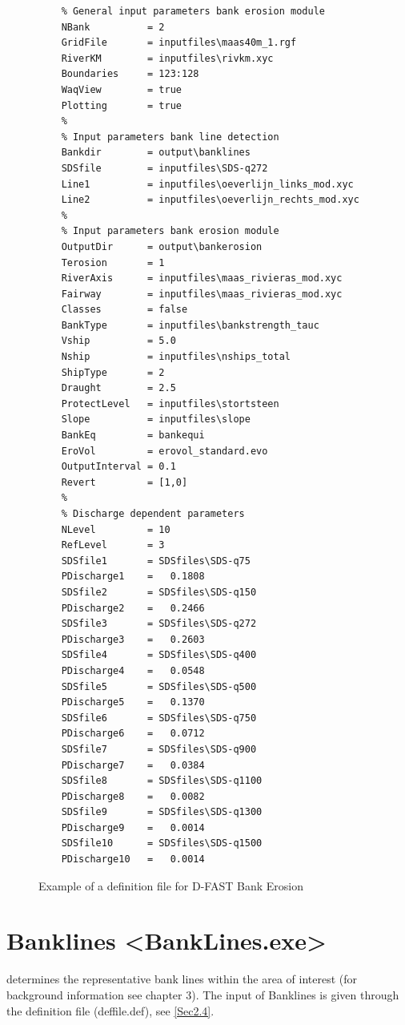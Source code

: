 \begin{figure}
\begin{verbatim}
    % General input parameters bank erosion module
    NBank          = 2
    GridFile       = inputfiles\maas40m_1.rgf
    RiverKM        = inputfiles\rivkm.xyc
    Boundaries     = 123:128
    WaqView        = true
    Plotting       = true
    %
    % Input parameters bank line detection
    Bankdir        = output\banklines
    SDSfile        = inputfiles\SDS-q272
    Line1          = inputfiles\oeverlijn_links_mod.xyc
    Line2          = inputfiles\oeverlijn_rechts_mod.xyc
    %
    % Input parameters bank erosion module
    OutputDir      = output\bankerosion
    Terosion       = 1
    RiverAxis      = inputfiles\maas_rivieras_mod.xyc
    Fairway        = inputfiles\maas_rivieras_mod.xyc
    Classes        = false
    BankType       = inputfiles\bankstrength_tauc
    Vship          = 5.0
    Nship          = inputfiles\nships_total
    ShipType       = 2
    Draught        = 2.5
    ProtectLevel   = inputfiles\stortsteen
    Slope          = inputfiles\slope
    BankEq         = bankequi
    EroVol         = erovol_standard.evo
    OutputInterval = 0.1
    Revert         = [1,0]
    %
    % Discharge dependent parameters
    NLevel         = 10
    RefLevel       = 3
    SDSfile1       = SDSfiles\SDS-q75
    PDischarge1    =   0.1808
    SDSfile2       = SDSfiles\SDS-q150
    PDischarge2    =   0.2466
    SDSfile3       = SDSfiles\SDS-q272
    PDischarge3    =   0.2603
    SDSfile4       = SDSfiles\SDS-q400
    PDischarge4    =   0.0548
    SDSfile5       = SDSfiles\SDS-q500
    PDischarge5    =   0.1370
    SDSfile6       = SDSfiles\SDS-q750
    PDischarge6    =   0.0712
    SDSfile7       = SDSfiles\SDS-q900
    PDischarge7    =   0.0384
    SDSfile8       = SDSfiles\SDS-q1100
    PDischarge8    =   0.0082
    SDSfile9       = SDSfiles\SDS-q1300
    PDischarge9    =   0.0014
    SDSfile10      = SDSfiles\SDS-q1500
    PDischarge10   =   0.0014
\end{verbatim}
\caption{Example of a definition file for D-FAST Bank Erosion}
\label{Fig2.1}
\end{figure}

\section{Banklines <BankLines.exe>}

determines the representative bank lines within the area of interest (for background information see chapter 3).
The input of Banklines is given through the definition file (deffile.def), see \autoref{Sec2.4}.

